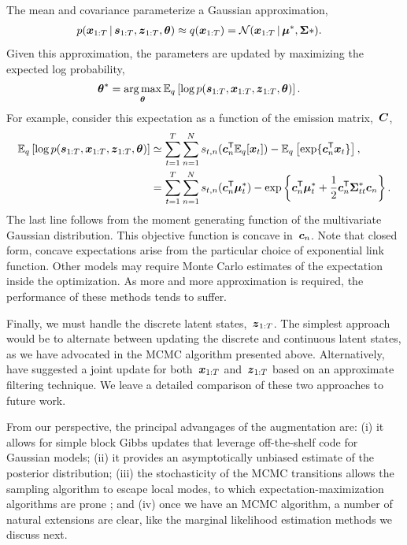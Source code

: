 The mean and covariance parameterize a Gaussian approximation,
\begin{align*}
  p(\boldsymbol{x}_{1:T} \,|\, \boldsymbol{s}_{1:T}, \boldsymbol{z}_{1:T}, \boldsymbol{\theta})
  &\approx
  q(\boldsymbol{x}_{1:T}) =
  \mathcal{N}(\boldsymbol{x}_{1:T} \,|\, \boldsymbol{\mu}^*, \boldsymbol{\Sigma}*).
\end{align*}
Given this approximation, the parameters are updated by maximizing
the expected log probability,
\begin{align*}
  \btheta^*
  &=
  \argmax_{\btheta} \bbE_{q} \left[ \log p(\bs_{1:T}, \bx_{1:T}, \bz_{1:T}, \btheta) \right]. 
\end{align*}
For example, consider this expectation as a function of the emission
matrix,~$\boldsymbol{C}$,
\begin{align*}
  \mathbb{E}_q \left[ \log p(\boldsymbol{s}_{1:T}, \boldsymbol{x}_{1:T}, \boldsymbol{z}_{1:T}, \boldsymbol{\theta}) \right]
  &\simeq
  \sum_{t=1}^T \sum_{n=1}^N s_{t,n} (\boldsymbol{c}_{n}^{\mathsf{T}} \mathbb{E}_q[\boldsymbol{x}_{t}]) - \mathbb{E}_q\left[\exp\{\boldsymbol{c}_n^{\mathsf{T}} \boldsymbol{x}_{t}\} \right], \\
  &=
  \sum_{t=1}^T \sum_{n=1}^N s_{t,n} (\boldsymbol{c}_{n}^{\mathsf{T}} \boldsymbol{\mu}_{t}^*)
  - \exp \left\{
  \boldsymbol{c}_n^{\mathsf{T}} \boldsymbol{\mu}_t^*  +\frac{1}{2} \boldsymbol{c}_n^{\mathsf{T}} \boldsymbol{\Sigma}_{tt}^* \boldsymbol{c}_n
  \right\}.
\end{align*}
The last line follows from the moment generating function of the
multivariate Gaussian distribution.  This objective function is
concave in~$\boldsymbol{c}_n$. Note that closed form, concave expectations
arise from the particular choice of exponential link function.
Other models may require Monte Carlo estimates of the expectation
inside the optimization. As more and more approximation is required,
the performance of these methods tends to suffer.

Finally, we must handle the discrete latent states,~$\boldsymbol{z}_{1:T}$.
The simplest approach would be to alternate between updating the
discrete and continuous latent states, as we have advocated in the
MCMC algorithm presented above. Alternatively, \citet{Petreska-2011}
have suggested a joint update for both~$\boldsymbol{x}_{1:T}$ and~$\boldsymbol{z}_{1:T}$
based on an approximate filtering technique. We leave a detailed
comparison of these two approaches to future work.

From our perspective, the principal advangages of the \polyagamma
augmentation are: (i) it allows for simple block Gibbs updates that
leverage off-the-shelf code for Gaussian models; (ii) it provides an
asymptotically unbiased estimate of the posterior distribution;
(iii) the stochasticity of the MCMC transitions allows the sampling
algorithm to escape local modes, to which expectation-maximization
algorithms are prone \citep{bishop2006pattern}; and (iv) once we
have an MCMC algorithm, a number of natural extensions are clear,
like the marginal likelihood estimation methods we discuss next.

